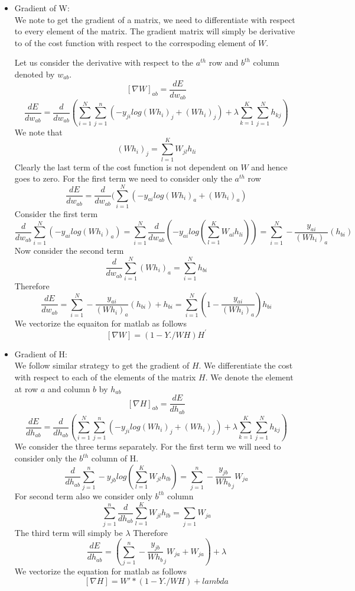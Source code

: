 \documentclass{article}
\begin{document}
\begin{itemize}
\item Gradient of W:\\
  We note to get the gradient of a matrix, we need to differentiate with respect to every element of the matrix. The gradient matrix will simply be derivative to of the cost function with respect to the correspoding element of $W$.

  Let us consider the derivative with respect to the $a^{th}$ row and $b^{th}$ column denoted by $w_{ab}$.
  $$[\nabla W]_{ab} = \frac{dE}{dw_{ab}}$$
  $$\frac{dE}{dw_{ab}} = \frac{d}{dw_{ab}}(\sum_{i=1}^N\sum_{j=1}^n(-y_{ji}log(Wh_i)_j + (Wh_i)_j) + \lambda\sum_{k=1}^K\sum_{j=1}^Nh_{kj})$$
  We note that
  $$(Wh_i)_j = \sum_{l=1}^KW_{jl}h_{li}$$
  Clearly the last term of the cost function is not dependent on $W$ and hence goes to zero. For the first term we need to consider only the $a^{th}$ row
  $$\frac{dE}{dw_{ab}} = \frac{d}{dw_{ab}}(\sum_{i=1}^N(-y_{ai}log(Wh_i)_a + (Wh_i)_a)$$
  Consider the first term
  $$\frac{d}{dw_{ab}}\sum_{i=1}^N(-y_{ai}log(Wh_i)_a) = \sum_{i=1}^N \frac{d}{dw_{ab}}(-y_{ai}log(\sum_{l=1}^KW_{al}h_{li})) =
  \sum_{i=1}^N -\frac{y_{ai}}{(Wh_i)_a}(h_{bi})$$
  Now consider the second term
  $$\frac{d}{dw_{ab}}\sum_{i=1}^N(Wh_i)_a = \sum_{i=1}^N h_{bi}$$
  Therefore
  $$\frac{dE}{dw_{ab}} = \sum_{i=1}^N -\frac{y_{ai}}{(Wh_i)_a}(h_{bi}) + h_{bi} = \sum_{i=1}^N(1-\frac{y_{ai}}{(Wh_i)_a})h_{bi}$$
  We vectorize the equaiton for matlab as follows
  $$[\nabla W] = (1 -Y./WH)H^{'}$$

\item Gradient of H:\\
  We follow similar strategy to get the gradient of $H$. We differentiate the cost with respect to each of the elements of the matrix $H$. We denote the element at row $a$ and column $b$ by $h_{ab}$
  $$[\nabla H]_{ab} = \frac{dE}{dh_{ab}}$$
  $$\frac{dE}{dh_{ab}} = \frac{d}{dh_{ab}}(\sum_{i=1}^N\sum_{j=1}^n(-y_{ji}log(Wh_i)_j + (Wh_i)_j) + \lambda\sum_{k=1}^K\sum_{j=1}^Nh_{kj})$$
  We consider the three terms separately. For the first term we will need to consider only the $b^{th}$ column of H. 
  $$\frac{d}{dh_{ab}}\sum_{j=1}^n -y_{jb}log(\sum_{l=1}^KW_{jl}h_{lb}) = \sum_{j=1}^n-\frac{y_{jb}}{Wh_b}_jW_{ja}$$
  For second term also we consider only $b^{th}$ column
  $$\sum_{j=1}^n \frac{d}{dh_{ab}}\sum_{l=1}^KW_{jl}h_{lb} = \sum_{j=1}W_{ja}$$
  The third term will simply be $\lambda$
  Therefore
  $$\frac{dE}{dh_{ab}} = (\sum_{j=1}^n-\frac{y_{jb}}{Wh_b}_jW_{ja} + W_{ja}) + \lambda$$
  We vectorize the equation for matlab as follows
  $$[\nabla H] = W'*(1 - Y./WH) + lambda$$
  
  
\end{itemize}
\end{document}
